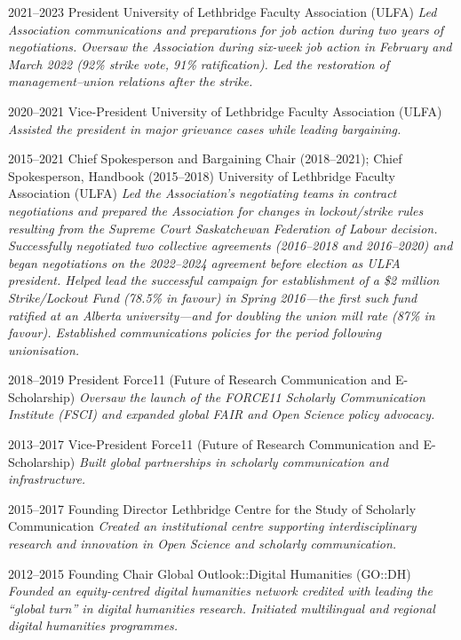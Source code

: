 \documentclass[11pt,letterpaper,sans]{moderncv}
\begin{document}
{\cventry
  {2021--2023}
  {President}
  {University of Lethbridge Faculty Association (ULFA)}
  {}
  {}
  {\textit{Led Association communications and preparations for job action during two years of negotiations. Oversaw the Association during six-week job action in February and March 2022 (92\% strike vote, 91\% ratification). Led the restoration of management--union relations after the strike.}}

\cventry
  {2020--2021}
  {Vice-President}
  {University of Lethbridge Faculty Association (ULFA)}
  {}
  {}
  {\textit{Assisted the president in major grievance cases while leading bargaining.}}

\cventry
  {2015--2021}
  {Chief Spokesperson and Bargaining Chair (2018--2021); Chief Spokesperson, Handbook (2015--2018)}
  {University of Lethbridge Faculty Association (ULFA)}
  {}
  {}
  {\textit{Led the Association’s negotiating teams in contract negotiations and prepared the Association for changes in lockout/strike rules resulting from the Supreme Court \emph{Saskatchewan Federation of Labour} decision. Successfully negotiated two collective agreements (2016--2018 and 2016--2020) and began negotiations on the 2022--2024 agreement before election as ULFA president. Helped lead the successful campaign for establishment of a \$2 million Strike/Lockout Fund (78.5\% in favour) in Spring 2016---the first such fund ratified at an Alberta university---and for doubling the union mill rate (87\% in favour). Established communications policies for the period following unionisation.}}

\cventry
  {2018--2019}
  {President}
  {Force11 (Future of Research Communication and E-Scholarship)}
  {}
  {}
  {\textit{Oversaw the launch of the FORCE11 Scholarly Communication Institute (FSCI) and expanded global FAIR and Open Science policy advocacy.}}

\cventry
  {2013--2017}
  {Vice-President}
  {Force11 (Future of Research Communication and E-Scholarship)}
  {}
  {}
  {\textit{Built global partnerships in scholarly communication and infrastructure.}}

\cventry
  {2015--2017}
  {Founding Director}
  {Lethbridge Centre for the Study of Scholarly Communication}
  {}
  {}
  {\textit{Created an institutional centre supporting interdisciplinary research and innovation in Open Science and scholarly communication.}}

\cventry
  {2012--2015}
  {Founding Chair}
  {Global Outlook::Digital Humanities (GO::DH)}
  {}
  {}
  {\textit{Founded an equity-centred digital humanities network credited with leading the “global turn” in digital humanities research. Initiated multilingual and regional digital humanities programmes.}}

}
\end{document}
